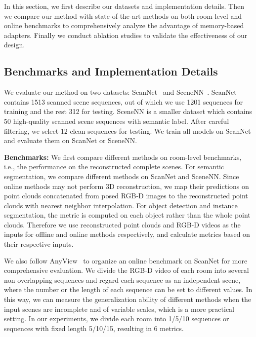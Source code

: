 
In this section, we first describe our datasets and implementation details. Then we compare our method with state-of-the-art methods on both room-level and online benchmarks to comprehensively analyze the advantage of memory-based adapters. Finally we conduct ablation studies to validate the effectiveness of our design.

\subsection{Benchmarks and Implementation Details}\label{impd}
We evaluate our method on two datasets: ScanNet~\cite{dai2017scannet} and SceneNN~\cite{hua2016scenenn}. ScanNet contains 1513 scanned scene sequences, out of which we use 1201 sequences for training and the rest 312 for testing. SceneNN is a smaller dataset which contains 50 high-quality scanned scene sequences with semantic label. After careful filtering, we select 12 clean sequences for testing. We train all models on ScanNet and evaluate them on ScanNet or SceneNN.

\textbf{Benchmarks:} We first compare different methods on room-level benchmarks, i.e., the performance on the reconstructed complete scenes. 
For semantic segmentation, we compare different methods on ScanNet and SceneNN. Since online methods may not perform 3D reconstruction, we map their predictions on point clouds concatenated from posed RGB-D images to the reconstructed point clouds with nearest neighbor interpolation. For object detection and instance segmentation, the metric is computed on each object rather than the whole point clouds. Therefore we use reconstructed point clouds and RGB-D videos as the inputs for offline and online methods respectively, and calculate metrics based on their respective inputs.

We also follow AnyView~\cite{wu2023anyview} to organize an online benchmark on ScanNet for more comprehensive evaluation. We divide the RGB-D video of each room into several non-overlapping sequences and regard each sequence as an independent scene, where the number or the length of each sequence can be set to different values. In this way, we can measure the generalization ability of different methods when the input scenes are incomplete and of variable scales, which is a more practical setting. In our experiments, we divide each room into 1/5/10 sequences or sequences with fixed length 5/10/15, resulting in 6 metrics.


